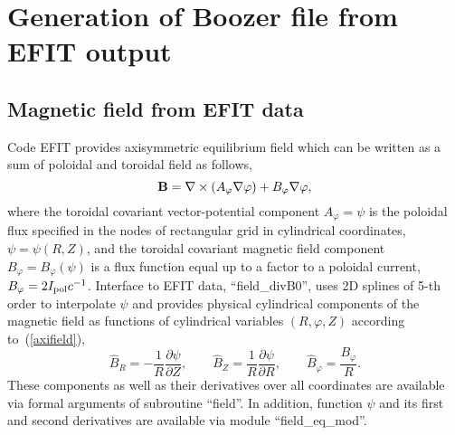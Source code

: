 \documentclass[12pt]{article}
\newcommand{\be}[1]{\begin{equation} \label{#1}}
\newcommand{\ee}{\end{equation}}
\newcommand{\eq}[1]{(\ref{#1})}
\newcommand{\difp}[2]{\frac{\partial #1}{\partial #2}}
\newcommand{\bB}{{\bf B}}
\begin{document}
\section{Generation of Boozer file from EFIT output}

\subsection{Magnetic field from EFIT data}
\label{ssec:efitdata}

Code EFIT provides axisymmetric equilibrium field which can be written as a sum of poloidal and toroidal field as follows,
\be{axifield}
\bB=\nabla\times\left(A_\varphi\nabla\varphi\right)+B_\varphi\nabla\varphi,
\ee
where the toroidal covariant vector-potential component $A_\varphi=\psi$ is the poloidal flux specified in the nodes of rectangular grid
in cylindrical coordinates, $\psi=\psi(R,Z)$, and the toroidal covariant magnetic field component $B_\varphi=B_\varphi(\psi)$ is a flux function
equal up to a factor to a poloidal current, $B_\varphi= 2 I_{\rm pol} c^{-1}$.
Interface to EFIT data, ``field\_divB0'', uses 2D splines of 5-th order to interpolate $\psi$ and provides physical cylindrical components of 
the magnetic field as functions of cylindrical variables $(R,\varphi,Z)$ according to~\eq{axifield},
\be{cylcomps}
\hat B_R = -\frac{1}{R}\difp{\psi}{Z},
\qquad
\hat B_Z = \frac{1}{R}\difp{\psi}{R},
\qquad
\hat B_\varphi = \frac{B_\varphi}{R}.
\ee
These components as well as their derivatives over all coordinates are available via formal arguments of subroutine ``field''. 
In addition, function $\psi$ and its first and second derivatives are available via module ``field\_eq\_mod''.
\end{document}

